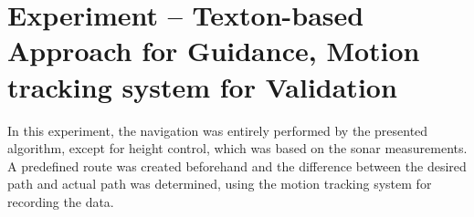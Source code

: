 
\section{Experiment -- Texton-based Approach for Guidance, Motion tracking system for Validation}
\label{sec:experiment-6}

In this experiment, the navigation was entirely performed by the
presented algorithm, except for height control, which was based on the
sonar measurements. A predefined route was created beforehand and the
difference between the desired path and actual path was determined,
using the motion tracking system for recording the data.
